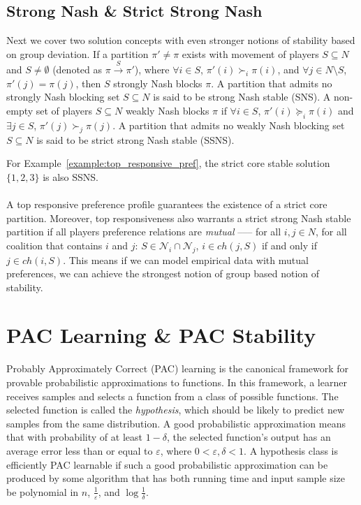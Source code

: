 \subsection{Strong Nash \& Strict Strong Nash}
\label{subsec:strong_nash_strict_strong_nash}
Next we cover two solution concepts with even stronger notions of stability
based on group deviation.
If a partition $\pi' \neq \pi$ exists with movement of players $S \subseteq N$
and $S \neq \emptyset$ (denoted as $\pi \xrightarrow{S} \pi'$), where
$\forall i \in S$, $\pi'(i) \succ_i \pi(i)$,
and $\forall j \in N\text{\textbackslash}S$, $\pi'(j) = \pi(j)$,
then $S$ strongly Nash blocks $\pi$.
A partition that admits no strongly Nash blocking set $S \subseteq N$ is said
to be strong Nash stable (SNS).
A non-empty set of players $S \subseteq N$ weakly Nash blocks $\pi$ if
$\forall i \in S$, $\pi'(i) \succeq_i \pi(i)$ and $\exists j \in S$,
$\pi'(j) \succ_j \pi(j)$.
A partition that admits no weakly Nash blocking set $S \subseteq N$ is said to
be strict strong Nash stable (SSNS).

For Example~\ref{example:top_responsive_pref}, the strict core stable solution
$\{1, 2, 3\}$ is also SSNS.

\paragraph{}
A top responsive preference profile guarantees the existence of a strict core partition.
Moreover, top responsiveness also warrants a strict strong Nash stable partition
if all players preference relations are \textit{mutual} ––– for all $i, j \in N$,
for all coalition that contains $i$ and $j$:
$S \in \mathcal{N}_i \cap \mathcal{N}_j$, $i \in ch(j, S)$ if and only if
$j \in ch(i, S)$.
This means if we can model empirical data with mutual preferences,
we can achieve the strongest notion of group based notion of stability.


\section{PAC Learning \& PAC Stability}
\label{sec:pac_learning_pac_stability}
Probably Approximately Correct (PAC) learning is the canonical framework for provable probabilistic approximations to functions. In this framework, a learner receives samples and selects a function from a class of possible functions. The selected function is called the \textit{hypothesis}, which should be likely to predict new samples from the same distribution. A good probabilistic approximation means that with probability of at least $1 - \delta$, the selected function's output has an average error less than or equal to $\varepsilon$, where $0 < \varepsilon, \delta < 1$. A hypothesis class is efficiently PAC learnable if such a good probabilistic approximation can be produced by some algorithm that has both running time and input sample size be polynomial in $n$, $\frac{1}{\varepsilon}$, and $\log{\frac{1}{\delta}}$.

